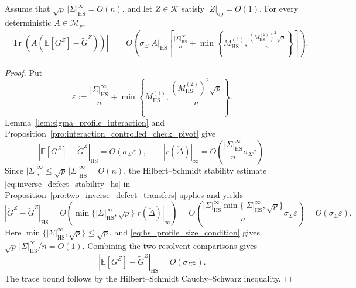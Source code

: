\documentclass[EJP, preprint, NODS, nobera, nofontexpansion]{ejpecp}
\DeclareMathOperator{\op}{op}
\DeclareMathOperator{\tr}{Tr}
\DeclareMathOperator{\hs}{HS}
\begin{document}
\begin{proposition}
\label{pro:sigma_profile_hs_comparison}
Assume that $\sqrt p\,|\Sigma|_{\hs}^\infty=O(n)$, and let
$Z\in\mathcal K$ satisfy $|Z|_{\op}=O(1)$.
For every deterministic $A\in\mathcal M_p$,
\begin{align*}
 \left|\tr\left(A(\mathbb E[G^Z]-\widetilde G^Z)\right)\right|
 &=O\left(\sigma_\Sigma|A|_{\hs}\left[
 \frac{|\Sigma|_{\hs}^\infty}n
 +\min\left\{
 M_{\hs}^{(1)},
 \frac{(M_{\hs}^{(2)})^2\sqrt p}{n}
 \right\}\right]\right).
\end{align*}
\end{proposition}

\begin{proof}
Put
\[
 \varepsilon:=\frac{|\Sigma|_{\hs}^\infty}n
 +\min\left\{
  M_{\hs}^{(1)},
  \frac{(M_{\hs}^{(2)})^2\sqrt p}{n}
 \right\}.
\]
Lemma~\ref{lem:sigma_profile_interaction} and
Proposition~\ref{pro:interaction_controlled_check_pivot} give
\[
 |\mathbb E[G^Z]-\check G^Z|_{\hs}
 =O\left(\sigma_\Sigma \varepsilon\right),
 \qquad
 |r(\check\Delta)|_\infty
 =O\left(\frac{|\Sigma|_{\hs}^\infty}n
           \sigma_\Sigma \varepsilon\right).
\]
Since $|\Sigma|_*^\infty\leq\sqrt p\,|\Sigma|_{\hs}^\infty
=O(n)$, the Hilbert--Schmidt stability estimate
\eqref{eq:inverse_defect_stability_hs} in
Proposition~\ref{pro:two_inverse_defect_transfers} applies and yields
\[
 |\check G^Z-\widetilde G^Z|_{\hs}
 =O\left(\min\{|\Sigma|_{\hs}^\infty,\sqrt p\}
              |r(\check\Delta)|_\infty\right)
    =O\left(\frac{|\Sigma|_{\hs}^\infty
                   \min\{|\Sigma|_{\hs}^\infty,\sqrt p\}}n
                  \sigma_\Sigma \varepsilon\right)
 =O\left(\sigma_\Sigma \varepsilon\right).
\]
Here $\min\{|\Sigma|_{\hs}^\infty,\sqrt p\}\leq\sqrt p$, and
\eqref{eq:hs_profile_size_condition} gives
$\sqrt p\,|\Sigma|_{\hs}^\infty/n=O(1)$.
Combining the two resolvent comparisons gives
\[
 |\mathbb E[G^Z]-\widetilde G^Z|_{\hs}
 =O\left(\sigma_\Sigma \varepsilon\right).
\]
The trace bound follows by the Hilbert--Schmidt Cauchy--Schwarz
inequality.
\end{proof}
\end{document}
